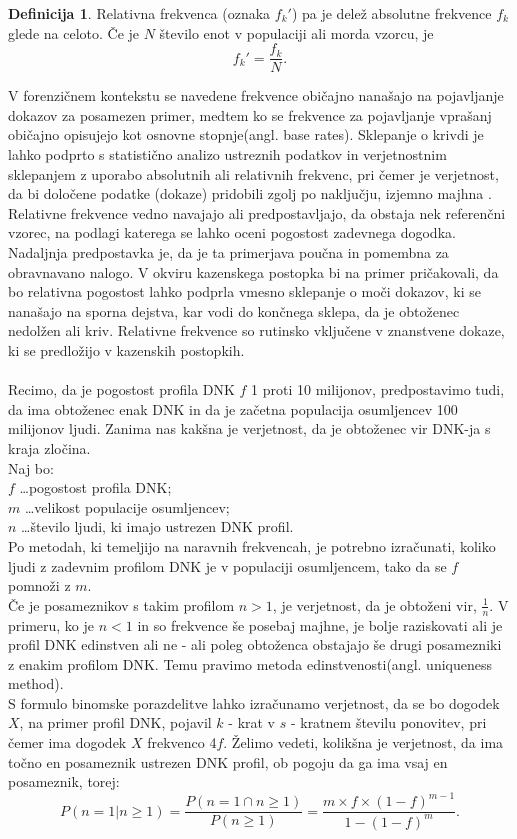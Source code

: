 \documentclass[12pt,a4paper]{amsart}
\theoremstyle{definition} %
\newtheorem{definicija}{Definicija}[section]
\theoremstyle{plain} %
\begin{document}
\begin{definicija}
    Relativna frekvenca (oznaka $f_k'$) pa je delež absolutne frekvence $f_k$ glede na celoto. Če je $N$ število enot v populaciji 
    ali morda vzorcu, je 
    \[
        f_k' = \frac{f_k}{N}.
    \]
\end{definicija}
V forenzičnem kontekstu se navedene frekvence običajno nanašajo na pojavljanje dokazov za posamezen primer, medtem ko se frekvence za 
pojavljanje vprašanj običajno opisujejo kot osnovne stopnje(angl. base rates). Sklepanje o krivdi je lahko podprto s statistično analizo 
ustreznih podatkov in verjetnostnim sklepanjem z uporabo absolutnih ali relativnih frekvenc, pri čemer je verjetnost, da bi določene 
podatke (dokaze) pridobili zgolj po naključju, izjemno majhna . Relativne frekvence vedno navajajo ali predpostavljajo, da obstaja nek 
referenčni vzorec, na podlagi katerega se lahko oceni pogostost zadevnega dogodka. Nadaljnja predpostavka je, da je ta primerjava poučna 
in pomembna za obravnavano nalogo. V okviru kazenskega postopka bi na primer pričakovali, da bo relativna pogostost lahko podprla 
vmesno sklepanje o moči dokazov, ki se nanašajo na sporna dejstva, kar vodi do končnega sklepa, da je obtoženec nedolžen ali kriv. Relativne 
frekvence so rutinsko vključene v znanstvene dokaze, ki se predložijo v kazenskih postopkih.\\\\
Recimo, da je pogostost profila DNK $f$ 1 proti 10 milijonov, predpostavimo tudi, da ima obtoženec enak DNK in da je začetna populacija osumljencev 
100 milijonov ljudi. Zanima nas kakšna je verjetnost, da je obtoženec vir DNK-ja s kraja zločina. \\
Naj bo: \\
$f$ \dots pogostost profila DNK;\\
$m$ \dots velikost populacije osumljencev; \\
$n$ \dots število ljudi, ki imajo ustrezen DNK profil. \\
Po metodah, ki temeljijo na naravnih frekvencah, je potrebno izračunati, koliko ljudi z zadevnim profilom DNK je v populaciji osumljencem, tako 
da se $f$ pomnoži z $m$.  \\
Če je posameznikov s takim profilom $n > 1$, je verjetnost, da je obtoženi vir, $\frac{1}{n}$. V primeru, ko je $n < 1$ in so frekvence še 
posebaj majhne, je bolje raziskovati ali je profil DNK edinstven ali ne - ali poleg obtoženca obstajajo še drugi posamezniki z enakim 
profilom DNK. Temu pravimo metoda edinstvenosti(angl. uniqueness method). \\
S formulo binomske porazdelitve lahko izračunamo verjetnost, da se bo dogodek $X$, na primer profil DNK, pojavil $k$ - krat v $s$ - kratnem 
številu ponovitev, pri čemer ima dogodek $X$ frekvenco 4$f$. Želimo vedeti, kolikšna je verjetnost, da ima točno en posameznik ustrezen DNK 
profil, ob pogoju da ga ima vsaj en posameznik, torej:
\[
    P(n = 1 \lvert n \ge 1) = \frac{P(n=1 \cap n \ge 1)}{P(n \ge 1)} = \frac{m \times f \times (1 - f)^{m-1}}{1 - (1 - f)^m}.
\]
\end{document}
